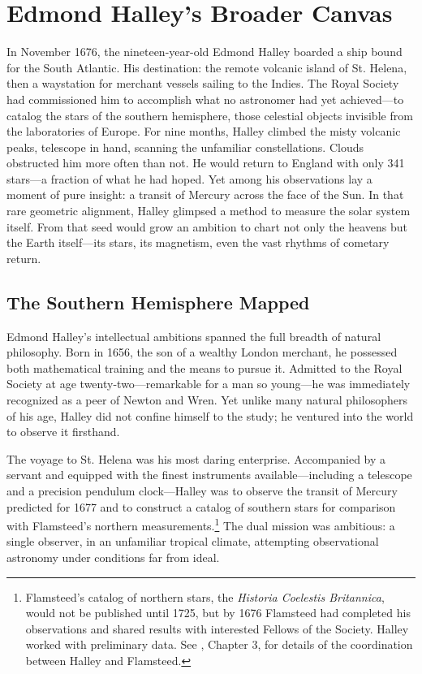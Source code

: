 \chapter{Edmond Halley's Broader Canvas}
\label{ch:halley-broader-canvas}

In November 1676, the nineteen-year-old Edmond Halley boarded a ship bound for the South Atlantic. His destination: the remote volcanic island of St. Helena, then a waystation for merchant vessels sailing to the Indies. The Royal Society had commissioned him to accomplish what no astronomer had yet achieved—to catalog the stars of the southern hemisphere, those celestial objects invisible from the laboratories of Europe. For nine months, Halley climbed the misty volcanic peaks, telescope in hand, scanning the unfamiliar constellations. Clouds obstructed him more often than not. He would return to England with only 341 stars—a fraction of what he had hoped. Yet among his observations lay a moment of pure insight: a transit of Mercury across the face of the Sun. In that rare geometric alignment, Halley glimpsed a method to measure the solar system itself. From that seed would grow an ambition to chart not only the heavens but the Earth itself—its stars, its magnetism, even the vast rhythms of cometary return.

\section{The Southern Hemisphere Mapped}

Edmond Halley's intellectual ambitions spanned the full breadth of natural philosophy. Born in 1656, the son of a wealthy London merchant, he possessed both mathematical training and the means to pursue it. Admitted to the Royal Society at age twenty-two—remarkable for a man so young—he was immediately recognized as a peer of Newton and Wren. Yet unlike many natural philosophers of his age, Halley did not confine himself to the study; he ventured into the world to observe it firsthand.

The voyage to St. Helena was his most daring enterprise. Accompanied by a servant and equipped with the finest instruments available—including a telescope and a precision pendulum clock—Halley was to observe the transit of Mercury predicted for 1677 and to construct a catalog of southern stars for comparison with Flamsteed's northern measurements.\footnote{Flamsteed's catalog of northern stars, the \emph{Historia Coelestis Britannica}, would not be published until 1725, but by 1676 Flamsteed had completed his observations and shared results with interested Fellows of the Society. Halley worked with preliminary data. See \textcite{Howse1980}, Chapter 3, for details of the coordination between Halley and Flamsteed.} The dual mission was ambitious: a single observer, in an unfamiliar tropical climate, attempting observational astronomy under conditions far from ideal.

